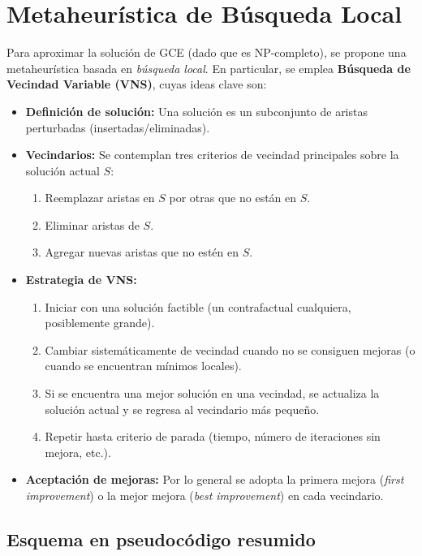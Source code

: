 \documentclass[a4paper]{article}
\begin{document}
\section{Metaheurística de Búsqueda Local}

Para aproximar la solución de GCE (dado que es NP-completo), se propone una metaheurística basada en \emph{búsqueda local}.  
En particular, se emplea \textbf{Búsqueda de Vecindad Variable (VNS)}, cuyas ideas clave son:

\begin{itemize}
    \item \textbf{Definición de solución:} 
    Una solución es un subconjunto de aristas perturbadas (insertadas/eliminadas).
    \item \textbf{Vecindarios:} 
    Se contemplan tres criterios de vecindad principales sobre la solución actual $S$:
    \begin{enumerate}
        \item Reemplazar aristas en $S$ por otras que no están en $S$. 
        \item Eliminar aristas de $S$. 
        \item Agregar nuevas aristas que no estén en $S$. 
    \end{enumerate}
    \item \textbf{Estrategia de VNS:} 
    \begin{enumerate}
        \item Iniciar con una solución factible (un contrafactual cualquiera, posiblemente grande).  
        \item Cambiar sistemáticamente de vecindad cuando no se consiguen mejoras (o cuando se encuentran mínimos locales).  
        \item Si se encuentra una mejor solución en una vecindad, se actualiza la solución actual y se regresa al vecindario más pequeño.  
        \item Repetir hasta criterio de parada (tiempo, número de iteraciones sin mejora, etc.). 
    \end{enumerate}
    \item \textbf{Aceptación de mejoras:} 
    Por lo general se adopta la primera mejora (\emph{first improvement}) o la mejor mejora (\emph{best improvement}) en cada vecindario.
\end{itemize}

\subsection*{Esquema en pseudocódigo resumido}
\end{document}
